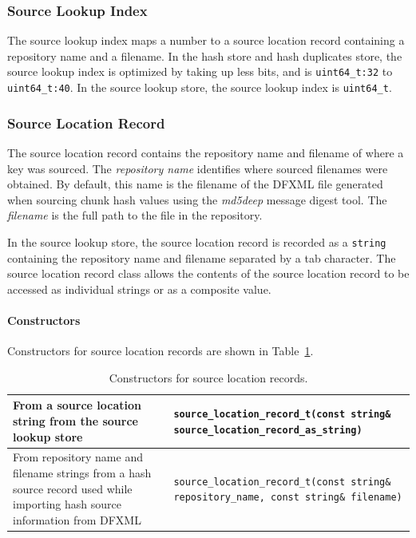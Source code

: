 \documentclass[10pt,twoside]{article}
\newcommand{\mdd}{\emph{md5deep}\xspace}
\begin{document}
\subsubsection{Source Lookup Index}
The source lookup index maps a number to a source location record
containing a repository name and a filename.
In the hash store and hash duplicates store, the source lookup index is optimized by taking up less bits,
and is \texttt{uint64\_t:32} to \texttt{uint64\_t:40}.
In the source lookup store, the source lookup index is \texttt{uint64\_t}.

\subsubsection{Source Location Record}
The source location record contains the repository name
and filename of where a key was sourced.
The \emph{repository name} identifies where sourced filenames were obtained.
By default, this name is the filename of the DFXML file generated
when sourcing chunk hash values using the \mdd message digest tool.
The \emph{filename} is the full path to the file in the repository.

In the source lookup store,
the source location record is recorded as a \texttt{string}
containing the repository name and filename separated by a tab character.
The source location record class allows the contents of the source location record
to be accessed as individual strings or as a composite value.
\paragraph{Constructors}
Constructors for source location records
are shown in Table~\ref{source-location-constructors}.
\begin{table}[h]
\center
\begin{tabular}{|p{2in}|p{4in}|}
\hline
From a source location string from the source lookup store & \texttt{source\_location\_record\_t(const string\& source\_location\_record\_as\_string)} \\
\hline
From repository name and filename strings from a hash source record used while importing hash source information from DFXML & \texttt{source\_location\_record\_t(const string\& repository\_name, const string\& filename)} \\
\hline
\end{tabular}
\caption{Constructors for source location records.\label{source-location-constructors}}
\end{table}
\end{document}
